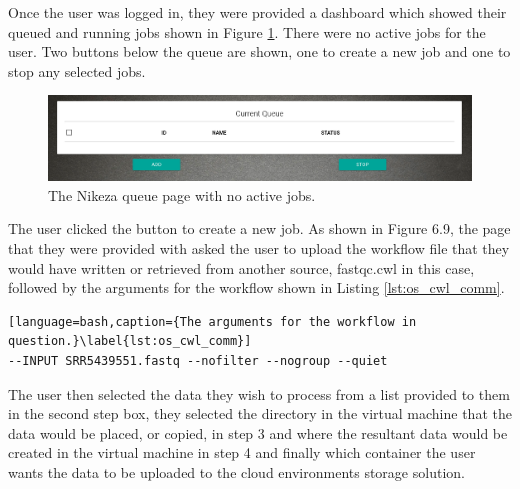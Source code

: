 Once the user was logged in, they were provided a dashboard which showed their queued and running jobs shown in Figure \ref{fig:os_queue}. There were no active jobs for the user. Two buttons below the queue are shown, one to create a new job and one to stop any selected jobs.

\begin{figure}[h!]
\centering
\includegraphics[width=\textwidth]{Figures/4_os_queue.png}
\decoRule
\caption[Nikeza Job Queue Page]{The Nikeza queue page with no active jobs.}
\label{fig:os_queue}
\end{figure}

The user clicked the button to create a new job. As shown in Figure 6.9, the page that they were provided with asked the user to upload the workflow file that they would have written or retrieved from another source, fastqc.cwl in this case, followed by the arguments for the workflow shown in Listing \ref{lst:os_cwl_comm}.

\begin{lstlisting}[language=bash,caption={The arguments for the workflow in question.}\label{lst:os_cwl_comm}]
--INPUT SRR5439551.fastq --nofilter --nogroup --quiet
\end{lstlisting}

The user then selected the data they wish to process from a list provided to them in the second step box, they selected the directory in the virtual machine that the data would be placed, or copied, in step 3 and where the resultant data would be created in the virtual machine in step 4 and finally which container the user wants the data to be uploaded to the cloud environments storage solution.

